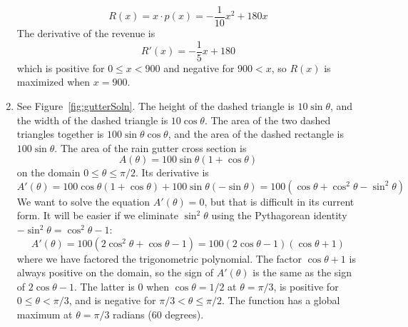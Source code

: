 \documentclass{article}
\begin{document}
\begin{enumerate}
\begin{displaymath}
    R(x) = x \cdot p(x) = -\frac{1}{10} x^2 + 180 x
  \end{displaymath}
  The derivative of the revenue is
  \begin{displaymath}
    R'(x) = -\frac{1}{5} x + 180
  \end{displaymath}
  which is positive for $0\le x < 900$ and negative for $900<x$, so
  $R(x)$ is maximized when $x=900$.
\item %
  See Figure~\ref{fig:gutterSoln}.  The height of the dashed triangle
  is $10\sin\theta$, and the width of the dashed triangle is
  $10\cos\theta$.  The area of the two dashed triangles together is
  $100\sin\theta\cos\theta$, and the area of the dashed rectangle is
  $100\sin\theta$.  The area of the rain gutter cross section is
  \begin{displaymath}
    A(\theta) = 100 \sin\theta(1+\cos\theta)
  \end{displaymath}
  on the domain $0\le \theta\le \pi/2$.  Its derivative is
  \begin{displaymath}
    A'(\theta) = 100 \cos\theta(1+\cos\theta) + 100\sin\theta(-\sin\theta)
    = 100 (\cos\theta + \cos^2\theta - \sin^2\theta)
  \end{displaymath}
  We want to solve the equation $A'(\theta)=0$, but that is difficult
  in its current form.  It will be easier if we eliminate
  $\sin^2\theta$ using the Pythagorean identity
  $-\sin^2\theta=\cos^2\theta-1$:
  \begin{displaymath}
    A'(\theta) = 100 (2\cos^2\theta + \cos\theta - 1)
    = 100 (2\cos\theta -1)(\cos\theta+1)
  \end{displaymath}
  where we have factored the trigonometric polynomial.  The factor
  $\cos\theta+1$ is always positive on the domain, so the sign of
  $A'(\theta)$ is the same as the sign of $2\cos\theta-1$.  The latter
  is $0$ when $\cos\theta=1/2$ at $\theta=\pi/3$, is positive for
  $0\le \theta < \pi/3$, and is negative for
  $\pi/3 < \theta \le \pi/2$.  The function has a global maximum at
  $\theta=\pi/3$ radians ($60$ degrees).
  \begin{figure}[htbp]
    \centering
\end{figure}
\end{enumerate}
\end{document}
